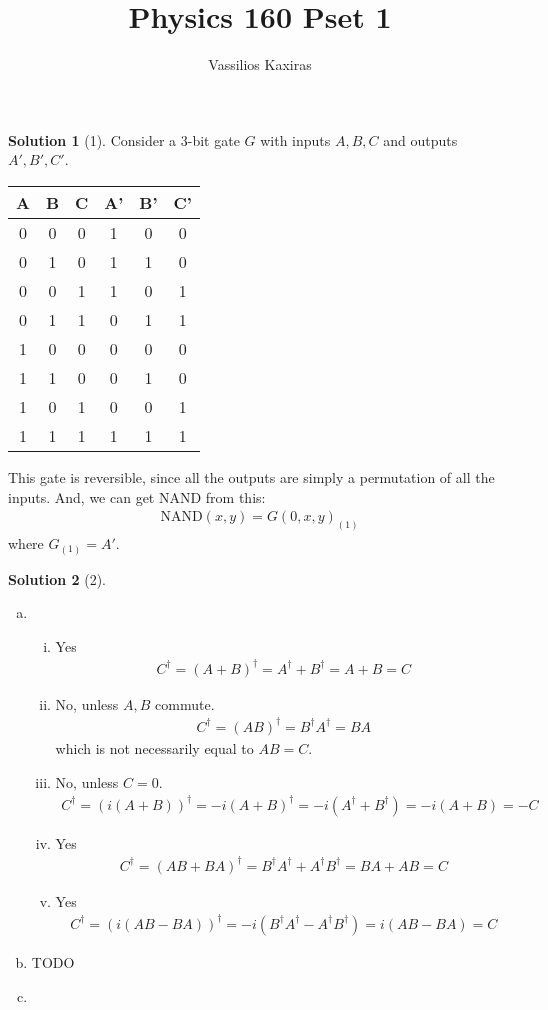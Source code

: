 \documentclass[11pt]{article}
\author{Vassilios Kaxiras}
\title{Physics 160 Pset 1}
\theoremstyle{definition}
\newtheorem*{solution}{Solution}
\newcommand{\eq}{\begin{equation}\begin{aligned}}
\newcommand{\qe}{\end{aligned}\end{equation}}
\begin{document}
\maketitle

\begin{solution}[1]
  Consider a 3-bit gate $G$ with inputs $A,B,C$ and outputs $A',B',C'$.
  \begin{center}
    \begin{tabular}{ccc|ccc}
      A & B & C & A' & B' & C' \\
      \hline
      0 & 0 & 0 & 1 & 0 & 0 \\
      0 & 1 & 0 & 1 & 1 & 0 \\
      0 & 0 & 1 & 1 & 0 & 1 \\
      0 & 1 & 1 & 0 & 1 & 1 \\
      1 & 0 & 0 & 0 & 0 & 0 \\
      1 & 1 & 0 & 0 & 1 & 0 \\
      1 & 0 & 1 & 0 & 0 & 1 \\
      1 & 1 & 1 & 1 & 1 & 1
    \end{tabular}
  \end{center}
  This gate is reversible, since all the outputs are simply a permutation of all the inputs. And, we can get NAND from this:
  \eq
    \text{NAND}(x,y)=G(0,x,y)_{(1)}
  \qe
  where $G_{(1)}=A'$.
\end{solution}

\begin{solution}[2]
  \begin{enumerate}[(a)]
    \item 
    \begin{enumerate}[i.]
      \item Yes
      \eq
        C^{\dagger}=(A+B)^{\dagger}=A^{\dagger}+B^{\dagger}=A+B=C
      \qe
      \item No, unless $A,B$ commute.
      \eq 
        C^{\dagger}=(AB)^{\dagger}=B^{\dagger}A^{\dagger}=BA
      \qe
      which is not necessarily equal to $AB=C$.
      \item No, unless $C=0$.
      \eq
        C^{\dagger}=(i(A+B))^{\dagger}=-i(A+B)^{\dagger}=-i(A^{\dagger}+B^{\dagger})=-i(A+B)=-C
      \qe
      \item Yes
      \eq
        C^{\dagger}=(AB+BA)^{\dagger}=B^{\dagger}A^{\dagger}+A^{\dagger}B^{\dagger}=BA+AB=C
      \qe
      \item Yes
      \eq
        C^{\dagger}=(i(AB-BA))^{\dagger}=-i(B^{\dagger}A^{\dagger}-A^{\dagger}B^{\dagger})=i(AB-BA)=C
      \qe
    \end{enumerate}
    \item TODO
    \item 
  \end{enumerate}
\end{solution}
\end{document}
